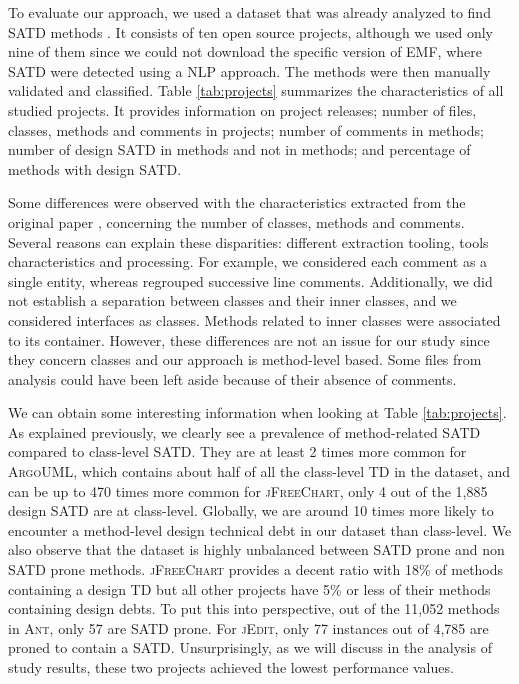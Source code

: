 To evaluate our approach, we used a dataset that was already analyzed to find \ac{SATD} methods \citep{maldonado17}. It consists of ten open source projects, although we used only nine of them since we could not download the specific version of EMF, where \ac{SATD} were detected using a \ac{NLP} approach. The methods were then manually validated and classified. Table \ref{tab:projects} summarizes the characteristics of all studied projects. It provides information on project releases; number of files, classes, methods and comments in projects; number of comments in methods; number of design \ac{SATD} in methods and not in methods; and percentage of methods with design \ac{SATD}. \par

Some differences were observed with the characteristics extracted from the original paper \citep{maldonado17}, concerning the number of classes, methods and comments. Several reasons can explain these disparities: different extraction tooling, tools characteristics and processing. For example, we considered each comment as a single entity, whereas \citet{maldonado17} regrouped successive line comments. Additionally, we did not establish a separation between classes and their inner classes, and we considered interfaces as classes. Methods related to inner classes were associated to its container. However, these differences are not an issue for our study since they concern classes and our approach is method-level based. Some files from \citet{maldonado17} analysis could have been left aside because of their absence of comments. \par 

We can obtain some interesting information when looking at Table \ref{tab:projects}. As explained previously, we clearly see a prevalence of method-related \ac{SATD} compared to class-level \ac{SATD}. They are at least 2 times more common for \textsc{ArgoUML}, which contains about half of all the class-level \ac{TD} in the dataset, and can be up to 470 times more common for \textsc{jFreeChart}, only 4 out of the 1,885 design \ac{SATD} are at class-level. Globally, we are around 10 times more likely to encounter a method-level design technical debt in our dataset than class-level. We also observe that the dataset is highly unbalanced between \ac{SATD} prone and non \ac{SATD} prone methods. \textsc{jFreeChart} provides a decent ratio with 18\% of methods containing a design \ac{TD} but all other projects have 5\% or less of their methods containing design debts. To put this into perspective, out of the 11,052 methods in \textsc{Ant}, only 57 are \ac{SATD} prone. For \textsc{jEdit}, only 77 instances out of 4,785 are proned to contain a \ac{SATD}. Unsurprisingly, as we will discuss in the analysis of study results, these two projects achieved the lowest performance values. \par 


